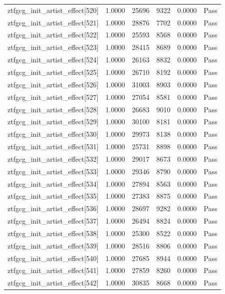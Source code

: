 \begin{table}[htbp]
\begin{tabular}{llrrll}
ztfgcg\_init\_artist\_effect[520] & 1.0000 & 25696 & 9322 & 0.0000 & Pass \\
ztfgcg\_init\_artist\_effect[521] & 1.0000 & 28876 & 7702 & 0.0000 & Pass \\
ztfgcg\_init\_artist\_effect[522] & 1.0000 & 25593 & 8568 & 0.0000 & Pass \\
ztfgcg\_init\_artist\_effect[523] & 1.0000 & 28415 & 8689 & 0.0000 & Pass \\
ztfgcg\_init\_artist\_effect[524] & 1.0000 & 26163 & 8832 & 0.0000 & Pass \\
ztfgcg\_init\_artist\_effect[525] & 1.0000 & 26710 & 8192 & 0.0000 & Pass \\
ztfgcg\_init\_artist\_effect[526] & 1.0000 & 31003 & 8903 & 0.0000 & Pass \\
ztfgcg\_init\_artist\_effect[527] & 1.0000 & 27054 & 8581 & 0.0000 & Pass \\
ztfgcg\_init\_artist\_effect[528] & 1.0000 & 26683 & 9010 & 0.0000 & Pass \\
ztfgcg\_init\_artist\_effect[529] & 1.0000 & 30100 & 8181 & 0.0000 & Pass \\
ztfgcg\_init\_artist\_effect[530] & 1.0000 & 29973 & 8138 & 0.0000 & Pass \\
ztfgcg\_init\_artist\_effect[531] & 1.0000 & 25731 & 8898 & 0.0000 & Pass \\
ztfgcg\_init\_artist\_effect[532] & 1.0000 & 29017 & 8673 & 0.0000 & Pass \\
ztfgcg\_init\_artist\_effect[533] & 1.0000 & 29346 & 8790 & 0.0000 & Pass \\
ztfgcg\_init\_artist\_effect[534] & 1.0000 & 27894 & 8563 & 0.0000 & Pass \\
ztfgcg\_init\_artist\_effect[535] & 1.0000 & 27383 & 8875 & 0.0000 & Pass \\
ztfgcg\_init\_artist\_effect[536] & 1.0000 & 28697 & 9282 & 0.0000 & Pass \\
ztfgcg\_init\_artist\_effect[537] & 1.0000 & 26494 & 8824 & 0.0000 & Pass \\
ztfgcg\_init\_artist\_effect[538] & 1.0000 & 25300 & 8522 & 0.0000 & Pass \\
ztfgcg\_init\_artist\_effect[539] & 1.0000 & 28516 & 8806 & 0.0000 & Pass \\
ztfgcg\_init\_artist\_effect[540] & 1.0000 & 27685 & 8944 & 0.0000 & Pass \\
ztfgcg\_init\_artist\_effect[541] & 1.0000 & 27859 & 8260 & 0.0000 & Pass \\
ztfgcg\_init\_artist\_effect[542] & 1.0000 & 30835 & 8668 & 0.0000 & Pass \\

\end{tabular}
\end{table}
